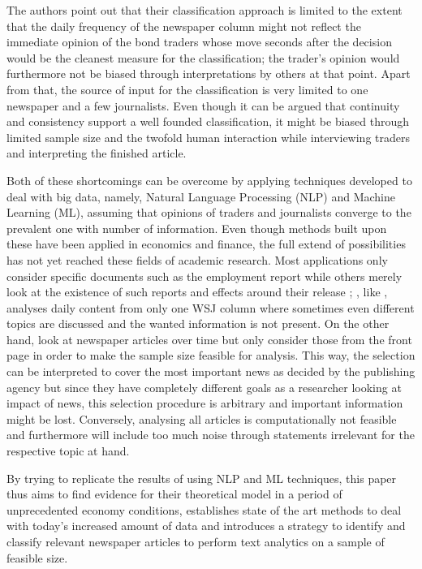 The authors point out that their classification approach is limited to the extent that the daily frequency of the newspaper column might not reflect the immediate opinion of the bond traders whose move seconds after the decision would be the cleanest measure for the classification; the trader's opinion would furthermore not be biased through interpretations by others at that point. Apart from that, the source of input for the classification is very limited to one newspaper and a few journalists. Even though it can be argued that continuity and consistency support a well founded classification, it might be biased through limited sample size and the twofold human interaction while interviewing traders and interpreting the finished article. 

Both of these shortcomings can be overcome by applying techniques developed to deal with big data, namely, Natural Language Processing (NLP) and Machine Learning (ML), assuming that opinions of traders and journalists converge to the prevalent one with number of information. Even though methods built upon these have been applied in economics and finance, the full extend of possibilities has not yet reached these fields of academic research. Most applications only consider specific documents such as the employment report \parencite{Hautsch.2002,Hess.2004} while others merely look at the existence of such reports and effects around their release \parencite{Bomfim.2003,Hautsch.2011,Lucca.2015}; \textcite{Tetlock.2007}, like \textcite{Ellingsen.2001}, analyses daily content from only one WSJ column where sometimes even different topics are discussed and the wanted information is not present. On the other hand, \textcite{Manela.2017} look at newspaper articles over time but only consider those from the front page in order to make the sample size feasible for analysis. This way, the selection can be interpreted to cover the most important news as decided by the publishing agency but since they have completely different goals as a researcher looking at impact of news, this selection procedure is arbitrary and important information might be lost. Conversely, analysing all articles is computationally not feasible and furthermore will include too much noise through statements irrelevant for the respective topic at hand.

By trying to replicate the results of \textcite{Ellingsen.2001} using NLP and ML techniques, this paper thus aims to find evidence for their theoretical model in a period of unprecedented economy conditions, establishes state of the art methods to deal with today's increased amount of data and introduces a strategy to identify and classify relevant newspaper articles to perform text analytics on a sample of feasible size. 

